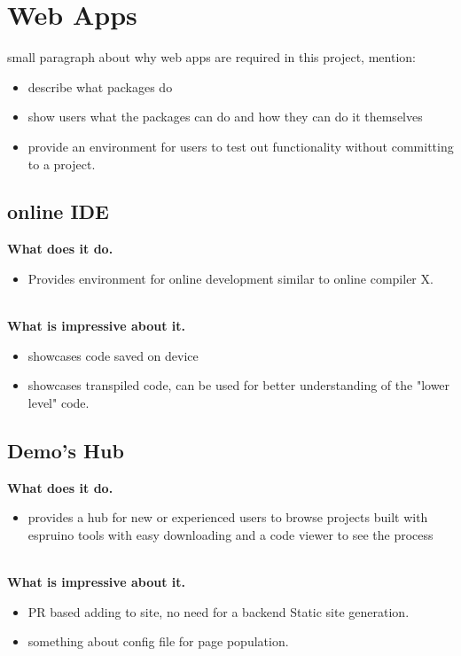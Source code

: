 \documentclass{l4proj}
\begin{document}
\section{Web Apps}

\text small paragraph about why web apps are required in this project, mention:

\begin{itemize}
    \item describe what packages do
    \item show users what the packages can do and how they can do it themselves
    \item provide an environment for users to test out functionality without committing to a project.
\end{itemize}

\subsection{online IDE}

\textbf{What does it do.}
\begin{itemize}
    \item Provides environment for online development similar to online compiler X.
\end{itemize}
\\
\textbf{What is impressive about it.}
\begin{itemize}
    \item showcases code saved on device
    \item showcases transpiled code, can be used for better understanding of the "lower level" code.
\end{itemize}

\subsection{Demo's Hub}
\textbf{What does it do.}
\begin{itemize}
    \item provides a hub for new or experienced users to browse projects built with espruino tools with easy downloading and a code viewer to see the process
\end{itemize}
\\
\textbf{What is impressive about it.}
\begin{itemize}
    \item PR based adding to site, no need for a backend Static site generation.
    \item something about config file for page population.
\end{itemize}
\end{document}
